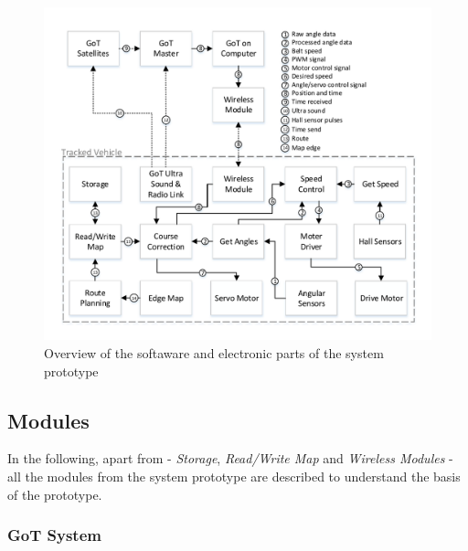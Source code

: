 \begin{figure}[H]
	\centering
	\includegraphics[scale=.9]{figures/systemOverview2}
	\caption{Overview of the softaware and electronic parts of the system prototype}
	\label{fig:systemOverview2}
\end{figure}

\subsection{Modules}
In the following, apart from - \textit{Storage}, \textit{Read/Write Map} and \textit{Wireless Modules} - all the modules from the system prototype are described to understand the basis of the prototype.


\subsubsection{GoT System}

